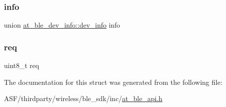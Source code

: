 \subsubsection{\texorpdfstring{info}{info}}
{\footnotesize\ttfamily union \mbox{\hyperlink{unionat__ble__dev__info_1_1dev__info}{at\+\_\+ble\+\_\+dev\+\_\+info\+::dev\+\_\+info}}  info}

\mbox{\label{structat__ble__dev__info_aee31b0c3b9c08cd76406c7bd7cf74642}} 
\subsubsection{\texorpdfstring{req}{req}}
{\footnotesize\ttfamily uint8\+\_\+t req}



The documentation for this struct was generated from the following file\+:\begin{DoxyCompactItemize}
\item 
A\+S\+F/thirdparty/wireless/ble\+\_\+sdk/inc/\mbox{\hyperlink{at__ble__api_8h}{at\+\_\+ble\+\_\+api.\+h}}\end{DoxyCompactItemize}

